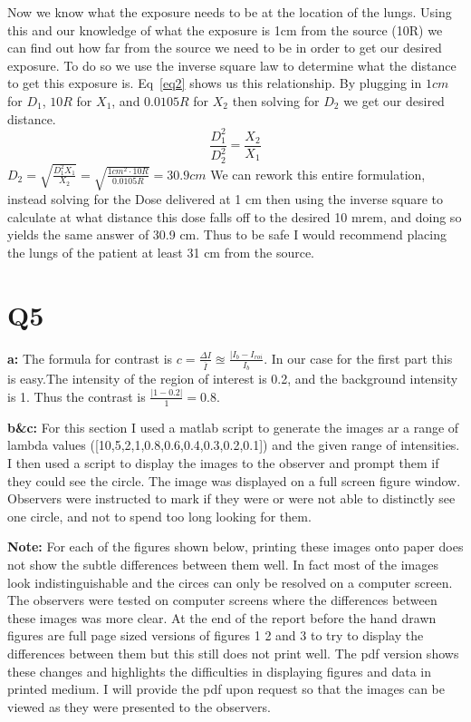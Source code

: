 \documentclass[12pt]{article}
\begin{document}
\noindent Now we know what the exposure needs to be at the location of the lungs. Using this and our knowledge of what the exposure is 1cm from the source (10R) we can find out how far from the source we need to be in order to get  our desired exposure. To do so we use the inverse square law to determine what the distance to get this exposure is. Eq~\ref{eq2} shows us this relationship. By plugging in $1cm$ for $D_1$, $10R$ for $X_1$, and $0.0105R$ for $X_2$ then solving for $D_2$ we get our desired distance.
\begin{equation}
\frac{D_1^2}{D_2^2} = \frac{X_2}{X_1}
\label{eq2}
\end{equation}
\noindent $D_2 = \sqrt{\frac{D_1^2X_1}{X_2}} = \sqrt{\frac{1cm^2\cdot 10R}{0.0105R}} = 30.9 cm$ We can rework this entire formulation, instead solving for the Dose delivered at 1 cm then using the inverse square to calculate at what distance this dose falls off to the desired 10 mrem, and doing so yields the same answer of 30.9 cm. Thus to be safe I would recommend placing the lungs of the patient at least 31 cm from the source. 
\section{Q5}
\noindent\textbf{a: } The formula for contrast is $c = \frac{\Delta I}{\overline{I}} \approxeq \frac{|I_b - I_{roi}}{I_b}$. In our case for the first part this is easy.The intensity of the region of interest is 0.2, and the background intensity is 1. Thus the contrast is $\frac{|1 - 0.2|}{1} = 0.8$.

\noindent\textbf{b\&c: }
For this section I used a matlab script to generate the images ar a range of lambda values ([10,5,2,1,0.8,0.6,0.4,0.3,0.2,0.1]) and the given range of intensities. I then used a script to display the images to the observer and prompt them if they could see the circle. The image was displayed on a full screen figure window. Observers were instructed to mark if they were or were not able to distinctly see one circle, and not to spend too long looking for them. 

\textbf{Note:} For each of the figures shown below, printing these images onto paper does not show the subtle differences between them well. In fact most of the images look indistinguishable and the circes can only be resolved on a computer screen. The observers were tested on computer screens where the differences between these images was more clear. At the end of the report before the hand drawn figures are full page sized versions of figures 1 2 and 3 to try to display the differences between them but this still does not print well. The pdf version shows these changes and highlights the difficulties in displaying figures and data in printed medium. I will provide the pdf upon request so that the images can be viewed as they were presented to the observers.
\end{document}
